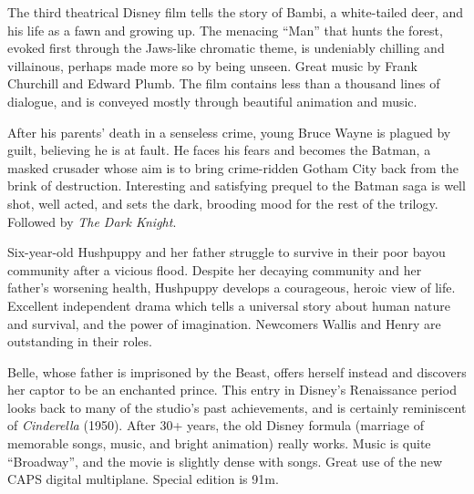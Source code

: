   The third theatrical Disney film tells the story of Bambi, a white-tailed deer, and his life as a fawn and growing up. The menacing ``Man'' that hunts the forest, evoked first through the Jaws-like chromatic theme, is undeniably chilling and villainous, perhaps made more so by being unseen. Great music by Frank Churchill and Edward Plumb. The film contains less than a thousand lines of dialogue, and is conveyed mostly through beautiful animation and music. \author{AW}

\iffalse
\movie{Barton Fink}{1991}{}{\four}
\fi

   After his parents' death in a senseless crime, young Bruce Wayne is plagued by guilt, believing he is at fault. He faces his fears and becomes the Batman, a masked crusader whose aim is to bring crime-ridden Gotham City back from the brink of destruction. Interesting and satisfying prequel to the Batman saga is well shot, well acted, and sets the dark, brooding mood for the rest of the trilogy. Followed by \textit{The Dark Knight}. \author{DW} 

   Six-year-old Hushpuppy and her father struggle to survive in their poor bayou community after a vicious flood. Despite her decaying community and her father's worsening health, Hushpuppy develops a courageous, heroic view of life. Excellent independent drama which tells a universal story about human nature and survival, and the power of imagination. Newcomers Wallis and Henry are outstanding in their roles. \author{DW} 

   Belle, whose father is imprisoned by the Beast, offers herself instead and discovers her captor to be an enchanted prince. This entry in Disney's Renaissance period looks back to many of the studio's past achievements, and is certainly reminiscent of \textit{Cinderella} (1950). After 30+ years, the old Disney formula (marriage of memorable songs, music, and bright animation) really works. Music is quite ``Broadway'', and the movie is slightly dense with songs. Great use of the new CAPS digital multiplane. Special edition is 91m. \author{AW} 

